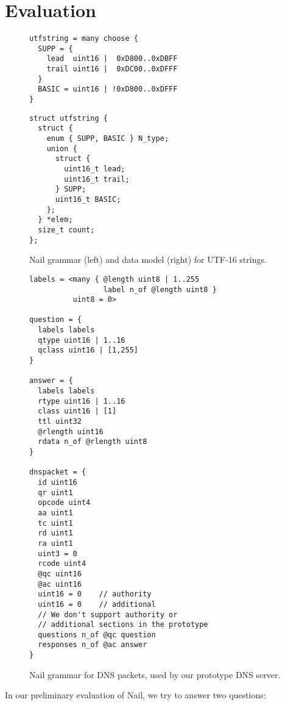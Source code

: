 \section{Evaluation}
\label{s:eval}

\begin{figure*}
\begin{minipage}{\columnwidth}
\begin{verbatim}
utfstring = many choose {
  SUPP = {
    lead  uint16 |  0xD800..0xDBFF
    trail uint16 |  0xDC00..0xDFFF
  }
  BASIC = uint16 | !0xD800..0xDFFF
}
\end{verbatim}
\end{minipage}
\hspace{\columnsep}
\begin{minipage}{\columnwidth}
\begin{verbatim}
struct utfstring {
  struct {
    enum { SUPP, BASIC } N_type;
    union {
      struct {
        uint16_t lead;
        uint16_t trail;
      } SUPP;
      uint16_t BASIC;
    };
  } *elem;
  size_t count;
};
\end{verbatim} 
\end{minipage}
\caption{Nail grammar (left) and data model (right) for UTF-16 strings.}
\label{fig:utf16}
\end{figure*}


\begin{figure}
\begin{verbatim}
labels = <many { @length uint8 | 1..255 
                 label n_of @length uint8 }
          uint8 = 0>

question = {
  labels labels
  qtype uint16 | 1..16 
  qclass uint16 | [1,255]
}

answer = {
  labels labels
  rtype uint16 | 1..16
  class uint16 | [1]
  ttl uint32
  @rlength uint16 
  rdata n_of @rlength uint8 
}

dnspacket = {
  id uint16
  qr uint1
  opcode uint4
  aa uint1 
  tc uint1
  rd uint1
  ra uint1
  uint3 = 0
  rcode uint4
  @qc uint16
  @ac uint16
  uint16 = 0    // authority 
  uint16 = 0    // additional
  // We don't support authority or 
  // additional sections in the prototype
  questions n_of @qc question
  responses n_of @ac answer
}
\end{verbatim}
\caption{Nail grammar for DNS packets, used by our prototype DNS server.}
\label{fig:dns-full}
\end{figure}


In our preliminary evaluation of Nail, we try to answer two questions:

